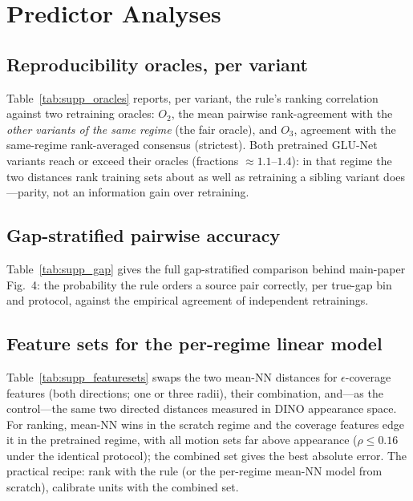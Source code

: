 \documentclass[runningheads]{llncs}
\newcommand{\pck}{PCK}
\begin{document}
\section{Predictor Analyses}
\label{supp:predict}

\subsection{Reproducibility oracles, per variant}
Table~\ref{tab:supp_oracles} reports, per variant, the rule's ranking
correlation against two retraining oracles: $O_2$, the mean pairwise
rank-agreement with the \emph{other variants of the same regime} (the fair
oracle), and $O_3$, agreement with the same-regime rank-averaged consensus
(strictest). Both pretrained GLU-Net variants reach or exceed their oracles
(fractions ${\approx}1.1$--$1.4$): in that regime the two distances rank
training sets about as well as retraining a sibling variant does---parity,
not an information gain over retraining.

\begin{table}[h]
\centering
\caption{Rule vs.\ retraining-reproducibility oracles, per variant.}
\label{tab:supp_oracles}
\small

\end{table}

\subsection{Gap-stratified pairwise accuracy}
Table~\ref{tab:supp_gap} gives the full gap-stratified comparison behind
main-paper Fig.~4: the probability the rule orders a source pair correctly,
per true-gap bin and protocol, against the empirical agreement of independent
retrainings.

\begin{table}[h]
\centering
\caption{Pairwise ordering accuracy by true \pck{} gap.}
\label{tab:supp_gap}
\small

\end{table}

\subsection{Feature sets for the per-regime linear model}
Table~\ref{tab:supp_featuresets} swaps the two mean-NN distances for
$\epsilon$-coverage features (both directions; one or three radii), their
combination, and---as the control---the same two directed distances measured
in DINO appearance space. For ranking, mean-NN wins in the scratch regime
and the coverage features edge it in the pretrained regime, with all motion
sets far above appearance ($\rho \le 0.16$ under the identical protocol);
the combined set gives the best absolute error. The practical recipe:
rank with the rule (or the per-regime mean-NN model from scratch), calibrate
units with the combined set.
\end{document}
